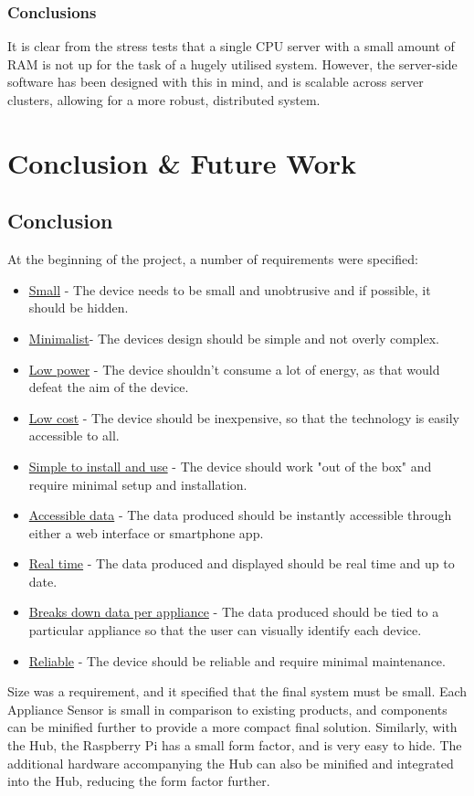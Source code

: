 \documentclass[draft,preprint,12pt,3p]{elsarticle}
\begin{document}
\subsubsection{Conclusions}
It is clear from the stress tests that a single CPU server with a small amount of RAM is not up for the task of a hugely utilised system. However, the server-side software has been designed with this in mind, and is scalable across server clusters, allowing for a more robust, distributed system.
\clearpage

\section{Conclusion \& Future Work}
\subsection{Conclusion}
At the beginning of the project, a number of requirements were specified:
\begin{itemize}
  \item \underline{Small} - The device needs to be small and unobtrusive and if possible, it should be hidden.
  \item \underline{Minimalist}- The devices design should be simple and not overly complex.
  \item \underline{Low power} - The device shouldn't consume a lot of energy, as that would defeat the aim of the device.
  \item \underline{Low cost} - The device should be inexpensive, so that the technology is easily accessible to all.
  \item \underline{Simple to install and use} - The device should work "out of the box" and require minimal setup and installation.
  \item \underline{Accessible data}  - The data produced should be instantly accessible through either a web interface or smartphone app.
  \item \underline{Real time} - The data produced and displayed should be real time and up to date.
  \item \underline{Breaks down data per appliance} - The data produced should be tied to a particular appliance so that the user can visually identify each device.
  \item \underline{Reliable} - The device should be reliable and require minimal maintenance.
\end{itemize}
Size was a requirement, and it specified that the final system must be small. Each Appliance Sensor is small in comparison to existing products, and components can be minified further to provide a more compact final solution. Similarly, with the Hub, the Raspberry Pi has a small form factor, and is very easy to hide. The additional hardware accompanying the Hub can also be minified and integrated into the Hub, reducing the form factor further.\\
\end{document}
